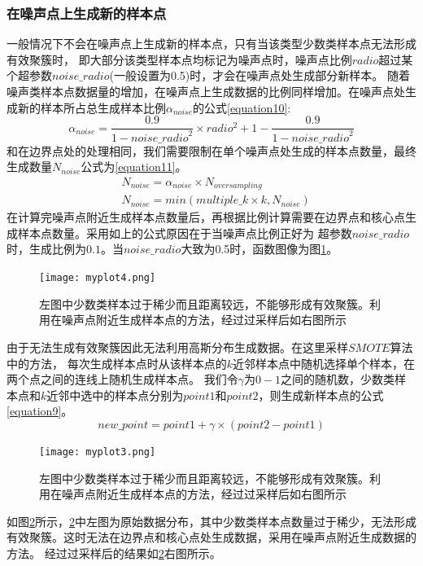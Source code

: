 \documentclass{article}
\begin{document}
\subsubsection{在噪声点上生成新的样本点}
一般情况下不会在噪声点上生成新的样本点，只有当该类型少数类样本点无法形成有效聚簇时，
即大部分该类型样本点均标记为噪声点时，噪声点比例$radio$超过某个超参数$noise\_radio$(一般设置为0.5)时，才会在噪声点处生成部分新样本。
随着噪声类样本点数据量的增加，在噪声点上生成数据的比例同样增加。在噪声点处生成新的样本所占总生成样本比例$\alpha_{noise}$的公式\ref{equation10}:
\begin{equation}
  \label{equation10}
  \alpha_{noise}=\frac{0.9}{1-{noise\_{radio}}^2}\times radio^2+1-\frac{0.9}{1-{noise\_radio}^2}
\end{equation}
和在边界点处的处理相同，我们需要限制在单个噪声点处生成的样本点数量，最终生成数量$N_{noise}$公式为\ref{equation11}。
\begin{equation}
  \label{equation11}
  \begin{aligned}
   &  N_{noise}=\alpha_{noise} \times N_{oversampling} \\
   & N_{noise}=min(multiple\_k \times k, N_{noise})
  \end{aligned}
\end{equation}
在计算完噪声点附近生成样本点数量后，再根据比例计算需要在边界点和核心点生成样本点数量。采用如上的公式原因在于当噪声点比例正好为
超参数$noise\_radio$时，生成比例为$0.1$。当$noise\_radio$大致为0.5时，函数图像为图\ref{fig4}。
\begin{figure}
  \centering
  \texttt{[image: myplot4.png]}
  \caption{左图中少数类样本过于稀少而且距离较远，不能够形成有效聚簇。利用在噪声点附近生成样本点的方法，经过过采样后如右图所示}
  \label{fig4}
\end{figure}
由于无法生成有效聚簇因此无法利用高斯分布生成数据。在这里采样$SMOTE$算法中的方法，
每次生成样本点时从该样本点的$k$近邻样本点中随机选择单个样本，在两个点之间的连线上随机生成样本点。
我们令$\gamma$为$0-1$之间的随机数，少数类样本点和$k$近邻中选中的样本点分别为$point1$和$point2$，则生成新样本点的公式\ref{equation9}。
\begin{equation}
  \label{equation9}
  new\_point=point1+\gamma \times (point2-point1)
\end{equation}
\begin{figure}
  \centering
  \texttt{[image: myplot3.png]}
  \caption{左图中少数类样本过于稀少而且距离较远，不能够形成有效聚簇。利用在噪声点附近生成样本点的方法，经过过采样后如右图所示}
  \label{fig3}
\end{figure}
如图\ref{fig3}所示，\ref{fig3}中左图为原始数据分布，其中少数类样本点数量过于稀少，无法形成有效聚簇。这时无法在边界点和核心点处生成数据，采用在噪声点附近生成数据的方法。
经过过采样后的结果如\ref{fig3}右图所示。
\end{document}
